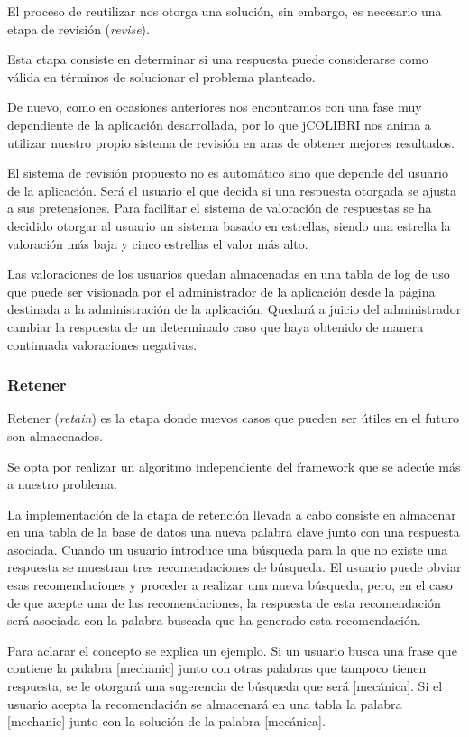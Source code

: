 El proceso de reutilizar nos otorga una solución, sin embargo, es necesario una etapa de revisión (\emph{revise}).

Esta etapa consiste en determinar si una respuesta puede considerarse como válida en términos de solucionar el problema planteado.

De nuevo, como en ocasiones anteriores nos encontramos con una fase muy dependiente de la aplicación desarrollada, por lo que jCOLIBRI nos anima a utilizar nuestro propio sistema de revisión en aras de obtener mejores resultados.

El sistema de revisión propuesto no es automático sino que depende del usuario de la aplicación. Será el usuario el que decida si una respuesta otorgada se ajusta a sus pretensiones. Para facilitar el sistema de valoración de respuestas se ha decidido otorgar al usuario un sistema basado en estrellas, siendo una estrella la valoración más baja y cinco estrellas el valor más alto.

Las valoraciones de los usuarios quedan almacenadas en una tabla de log de uso que puede ser visionada por el administrador de la aplicación desde la página destinada a la administración de la aplicación. Quedará a juicio del administrador cambiar la respuesta de un determinado caso que haya obtenido de manera continuada valoraciones negativas.

\subsubsection{Retener}\label{retener}

Retener (\emph{retain}) es la etapa donde nuevos casos que pueden ser útiles en el futuro son almacenados.

Se opta por realizar un algoritmo independiente del framework que se adecúe más a nuestro problema.

La implementación de la etapa de retención llevada a cabo consiste en almacenar en una tabla de la base de datos una nueva palabra clave junto con una respuesta asociada. Cuando un usuario introduce una búsqueda para la que no existe una respuesta se muestran tres recomendaciones de búsqueda. El usuario puede obviar esas recomendaciones y proceder a realizar una nueva búsqueda, pero, en el caso de que acepte una de las recomendaciones, la respuesta de esta recomendación será asociada con la palabra buscada que ha generado esta recomendación.

Para aclarar el concepto se explica un ejemplo. Si un usuario busca una frase que contiene la palabra [mechanic] junto con otras palabras que tampoco tienen respuesta, se le otorgará una sugerencia de búsqueda que será [mecánica]. Si el usuario acepta la recomendación se almacenará en una tabla la palabra [mechanic] junto con la solución de la palabra [mecánica].

